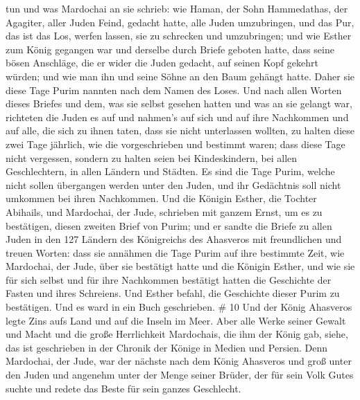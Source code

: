 tun und was Mardochai an sie schrieb:  wie Haman, der Sohn
Hammedathas, der Agagiter, aller Juden Feind, gedacht hatte, alle Juden
umzubringen, und das Pur, das ist das Los, werfen lassen, sie zu
schrecken und umzubringen;  und wie Esther zum König
gegangen war und derselbe durch Briefe geboten hatte, dass seine bösen
Anschläge, die er wider die Juden gedacht, auf seinen Kopf gekehrt
würden; und wie man ihn und seine Söhne an den Baum gehängt hatte.
 Daher sie diese Tage Purim nannten nach dem Namen des
Loses. Und nach allen Worten dieses Briefes und dem, was sie selbst
gesehen hatten und was an sie gelangt war,  richteten die
Juden es auf und nahmen's auf sich und auf ihre Nachkommen und auf alle,
die sich zu ihnen taten, dass sie nicht unterlassen wollten, zu halten
diese zwei Tage jährlich, wie die vorgeschrieben und bestimmt waren;
 dass diese Tage nicht vergessen, sondern zu halten seien
bei Kindeskindern, bei allen Geschlechtern, in allen Ländern und
Städten. Es sind die Tage Purim, welche nicht sollen übergangen werden
unter den Juden, und ihr Gedächtnis soll nicht umkommen bei ihren
Nachkommen.  Und die Königin Esther, die Tochter Abihails,
und Mardochai, der Jude, schrieben mit ganzem Ernst, um es zu
bestätigen, diesen zweiten Brief von Purim;  und er sandte
die Briefe zu allen Juden in den 127 Ländern des Königreichs des
Ahasveros mit freundlichen und treuen Worten:  dass sie
annähmen die Tage Purim auf ihre bestimmte Zeit, wie Mardochai, der
Jude, über sie bestätigt hatte und die Königin Esther, und wie sie für
sich selbst und für ihre Nachkommen bestätigt hatten die Geschichte der
Fasten und ihres Schreiens.  Und Esther befahl, die
Geschichte dieser Purim zu bestätigen. Und es ward in ein Buch
geschrieben. \# 10  Und der König Ahasveros legte Zins aufs
Land und auf die Inseln im Meer.  Aber alle Werke seiner
Gewalt und Macht und die große Herrlichkeit Mardochais, die ihm der
König gab, siehe, das ist geschrieben in der Chronik der Könige in
Medien und Persien.  Denn Mardochai, der Jude, war der
nächste nach dem König Ahasveros und groß unter den Juden und angenehm
unter der Menge seiner Brüder, der für sein Volk Gutes suchte und redete
das Beste für sein ganzes Geschlecht.
